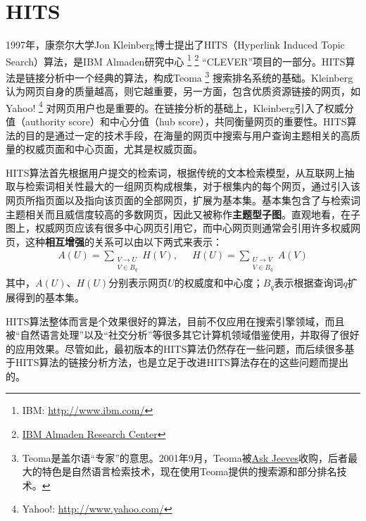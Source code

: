 \section{HITS}
1997年，康奈尔大学Jon Kleinberg博士\cite{kleinberg1999authoritative}提出了HITS（Hyperlink Induced Topic Search）算法，是IBM Almaden研究中心
\footnote{IBM: \href{http://www.ibm.com/}{http://www.ibm.com/}}
\footnote{\href{http://www.almaden.ibm.com/}{IBM Almaden Research Center}}
“CLEVER”项目的一部分。HITS算法是链接分析中一个经典的算法，构成Teoma
\footnote{Teoma是盖尔语“专家”的意思。2001年9月，Teoma被\href{http://www.ask.com/}{Ask Jeeves}收购，后者最大的特色是自然语言检索技术，现在使用Teoma提供的搜索源和部分排名技术。}
搜索排名系统的基础。Kleinberg认为网页自身的质量越高，则它越重要，另一方面，包含优质资源链接的网页，如Yahoo!
\footnote{Yahoo!: \href{http://www.yahoo.com/}{http://www.yahoo.com/}}
对网页用户也是重要的。在链接分析的基础上，Kleinberg引入了权威分值（authority score）和中心分值（hub score），共同衡量网页的重要性。HITS算法的目的是通过一定的技术手段，在海量的网页中搜索与用户查询主题相关的高质量的权威页面和中心页面，尤其是权威页面。

HITS算法首先根据用户提交的检索词，根据传统的文本检索模型，从互联网上抽取与检索词相关性最大的一组网页构成根集，对于根集内的每个网页，通过引入该网页所指页面以及指向该页面的全部网页，扩展为基本集。基本集包含了与检索词主题相关而且威信度较高的多数网页，因此又被称作\textbf{主题型子图}。直观地看，在子图上，权威网页应该有很多中心网页引用它，而中心网页则通常会引用许多权威网页，这种\textbf{相互增强}的关系可以由以下两式来表示：
\begin{equation}\label{eq:hitsalgorithm}
    \begin{array}{cc}
        A(U) =\sum\limits_{\substack{V\rightarrow U\\V \in B_q}}{H(V)},~~~ & H(U)=\sum\limits_{\substack{U\rightarrow V\\V \in B_q}}{A(V)}
    \end{array}
\end{equation}
其中，$A(U)$、$H(U)$分别表示网页$U$的权威度和中心度；$B_q$表示根据查询词$q$扩展得到的基本集。

HITS算法整体而言是个效果很好的算法，目前不仅应用在搜索引擎领域，而且被“自然语言处理”以及“社交分析”等很多其它计算机领域借鉴使用，并取得了很好的应用效果。尽管如此，最初版本的HITS算法仍然存在一些问题，而后续很多基于HITS算法的链接分析方法，也是立足于改进HITS算法存在的这些问题而提出的。

